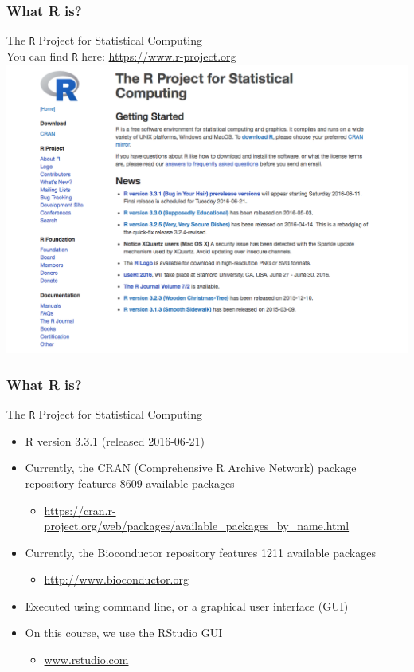 \documentclass{beamer}
\begin{document}
\begin{frame}
	\frametitle{What R is?}
        \Large The \texttt{R} Project for Statistical Computing\\
	\small You can find \texttt{R} here:
	\url{https://www.r-project.org}\\
	\includegraphics[scale=0.25]{figures/R-project.png}
\end{frame}

\begin{frame}
	\frametitle{What R is?}
        \Large The \texttt{R} Project for Statistical Computing\\
	\begin{itemize}
		\small
		\item R version 3.3.1 (released 2016-06-21)
		\item Currently, the CRAN {\tiny(Comprehensive R Archive Network)} package repository features 8609 available packages
			\begin{itemize}
				\item \tiny \url{https://cran.r-project.org/web/packages/available_packages_by_name.html}
			\end{itemize}
		\item Currently, the Bioconductor repository features 1211 available packages
			\begin{itemize}
				\item \tiny \url{http://www.bioconductor.org}
			\end{itemize}
		\item Executed using command line, or a graphical user interface (GUI)
		\item On this course, we use the RStudio GUI
			\begin{itemize}
				\item \tiny \url{www.rstudio.com}
			\end{itemize}
	\end{itemize}
\end{frame}
\end{document}
